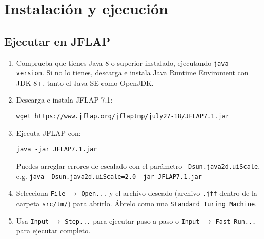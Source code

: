 \section{Instalación y ejecución}

\subsection*{Ejecutar en JFLAP\supercite{jflap}}
\begin{enumerate}
  \item Comprueba que tienes Java 8 o superior instalado, ejecutando \texttt{java --version}. Si no lo tienes, descarga e instala Java Runtime Enviroment con JDK 8+, tanto el Java SE como OpenJDK.
  \item Descarga e instala JFLAP 7.1:
  \begin{verbatim}
wget https://www.jflap.org/jflaptmp/july27-18/JFLAP7.1.jar
  \end{verbatim}
  \item Ejecuta JFLAP con:
  \begin{verbatim}
java -jar JFLAP7.1.jar
  \end{verbatim}
  Puedes arreglar errores de escalado con el parámetro \texttt{-Dsun.java2d.uiScale}, e.g. \texttt{java -Dsun.java2d.uiScale=2.0 -jar JFLAP7.1.jar}
  \item Selecciona \texttt{File} $\rightarrow$ \texttt{Open...} y el archivo deseado (archivo \texttt{.jff} dentro de la carpeta \texttt{src/tm/}) para abrirlo. Ábrelo como una \texttt{Standard Turing Machine}.
  \item Usa \texttt{Input} $\rightarrow$ \texttt{Step...} para ejecutar paso a paso o \texttt{Input} $\rightarrow$ \texttt{Fast Run...} para ejecutar completo.
\end{enumerate}


